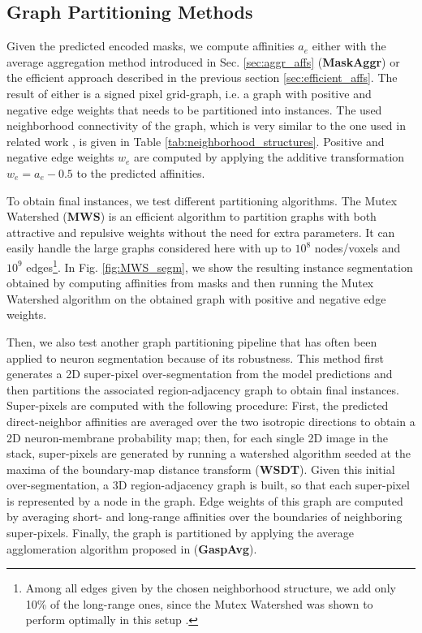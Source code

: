 \subsection{Graph Partitioning Methods} 
Given the predicted encoded \maskname masks, we compute affinities $a_e$ either with the average aggregation method introduced in Sec. \ref{sec:aggr_affs} (\textbf{MaskAggr}) or the efficient approach described in the previous section \ref{sec:efficient_affs}. 
The result of either is a signed pixel grid-graph, i.e. a graph with positive and negative edge weights that needs to be partitioned into instances. 
The used neighborhood connectivity of the graph, which is very similar to the one used in related work \cite{wolf2018mutex,lee2017superhuman}, is given in Table \ref{tab:neighborhood_structures}. Positive and negative edge weights $w_e$ are computed by applying the additive transformation $w_e=a_e-0.5$ to the predicted affinities.




To obtain final instances, we test different partitioning algorithms.
The Mutex Watershed (\textbf{MWS}) \cite{wolf2018mutex} is an efficient algorithm to partition graphs with both attractive and repulsive weights without the need for extra parameters. It can easily handle the large graphs considered here with up to $10^8$ nodes/voxels and $10^9$ edges\footnote{Among all edges given by the chosen neighborhood structure, we add only 10\% of the long-range ones, since the Mutex Watershed was shown to perform optimally in this setup \cite{bailoni2019generalized,wolf2018mutex}.}. In Fig. \ref{fig:MWS_segm}, we show the resulting instance segmentation obtained by computing affinities from \maskname masks and then running the Mutex Watershed algorithm on the obtained graph with positive and negative edge weights.


Then, we also test another graph partitioning pipeline that has often been applied to neuron segmentation because of its robustness. This method first generates a 2D super-pixel over-segmentation from the model predictions and then partitions the associated region-adjacency graph to obtain final instances. Super-pixels are computed with the following procedure: First, the predicted direct-neighbor affinities are averaged over the two isotropic directions to obtain a 2D neuron-membrane probability map; then, for each single 2D image in the stack, super-pixels are generated by running a watershed algorithm seeded at the maxima of the boundary-map distance transform (\textbf{WSDT}). Given this initial over-segmentation, a 3D region-adjacency graph is built, so that each super-pixel is represented by a node in the graph. Edge weights of this graph are computed by averaging short- and long-range affinities over the boundaries of neighboring super-pixels. 
Finally, the graph is partitioned by applying the average agglomeration algorithm proposed in \cite{bailoni2019generalized} (\textbf{GaspAvg}).

